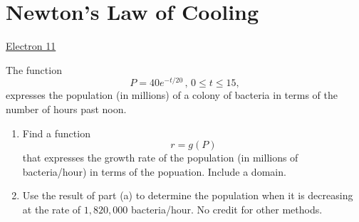 \documentclass{ximera}
\begin{document}
\section{Newton's Law of Cooling}



\begin{exploration} \label{Edgvb5rthh}

\begin{onlineOnly}
    \begin{center}
\end{center}
\end{onlineOnly}

\href{https://www.desmos.com/calculator/yebumxuwms}{Electron 11}


\end{exploration}

\begin{question}  \label{Qhvvbrmb4}
 The function
\[
    P = 40 e^{-t/20} \, , \, 0\leq t \leq 15 ,
\]
expresses the population (in millions) of a colony of bacteria in terms of the number of hours past noon.

\begin{enumerate}
\item Find a function
\[
       r = g(P)
\]
that expresses the growth rate of the population (in millions of bacteria/hour) in terms of the popuation. Include a domain.

\item Use the result of part (a) to determine the population when it is decreasing at the rate of $1,820,000$ bacteria/hour. No credit for other methods.
   


\end{enumerate}


\end{question}
\end{document}
